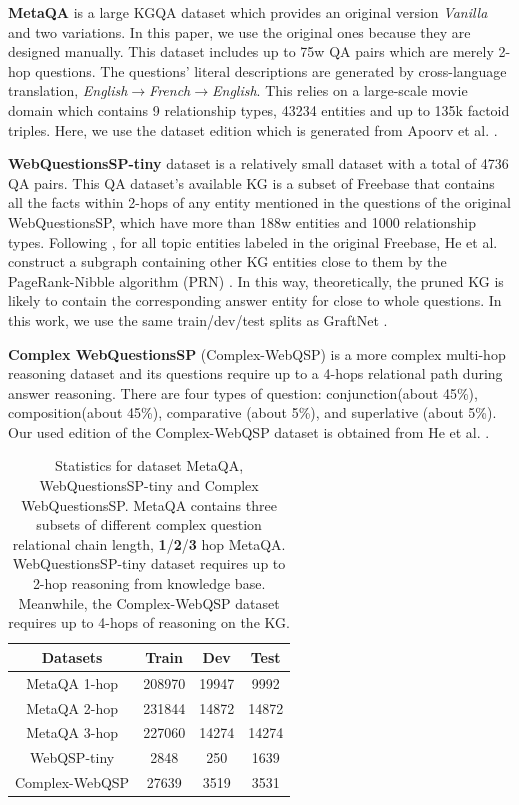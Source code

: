 \documentclass[pdflatex,sn-mathphys]{sn-jnl}%
\theoremstyle{thmstyleone}%
\theoremstyle{thmstyletwo}%
\theoremstyle{thmstylethree}%
\begin{document}
\textbf{MetaQA} \cite{zhang2018metaQA} is a large KGQA dataset which provides an original version \textit{Vanilla} and two variations. In this paper, we use the original ones because they are designed manually. This dataset includes up to 75w QA pairs which are merely 2-hop questions. The questions' literal descriptions are generated by cross-language translation, \textit{English$\rightarrow$French$\rightarrow$English}. This relies on a large-scale movie domain which contains 9 relationship types, 43234 entities and up to 135k factoid triples. Here, we use the dataset edition which is generated from Apoorv et al. \cite{apoorv2020embedKGQA}.

\textbf{WebQuestionsSP-tiny} \cite{tauyih2016wbquestion} dataset is a relatively small dataset with a total of 4736 QA pairs. This QA dataset's available KG is a subset of Freebase  that contains all the facts within 2-hops of any entity mentioned in the questions of the original WebQuestionsSP, which have more than 188w entities and 1000 relationship types. Following \cite{apoorv2020embedKGQA}, for all topic entities labeled in the original Freebase, He et al. \cite{he2021stu-teaQA} construct a subgraph containing other KG entities close to them by the PageRank-Nibble algorithm (PRN) \cite{rpn}. In this way, theoretically, the pruned KG is likely to contain the corresponding answer entity for close to whole questions. In this work, we use the same train/dev/test splits as GraftNet \cite{sun2018graftnet}.


\textbf{Complex WebQuestionsSP} (Complex-WebQSP)\cite{TalmorCWQ} is a more complex multi-hop reasoning dataset and its questions require up to a 4-hops relational path during answer reasoning. There are four types of question: conjunction(about 45\%),  composition(about 45\%), comparative (about 5\%), and superlative (about 5\%). Our used edition of the Complex-WebQSP dataset is obtained from He et al. \cite{he2021stu-teaQA}.

\begin{table}[h]
\renewcommand{\arraystretch}{1.2}
\caption{Statistics for dataset MetaQA, WebQuestionsSP-tiny and Complex WebQuestionsSP. MetaQA contains three subsets of different complex question relational chain length, \textbf{1}/\textbf{2}/\textbf{3} hop MetaQA. WebQuestionsSP-tiny dataset requires up to 2-hop reasoning from knowledge base. Meanwhile, the Complex-WebQSP dataset requires up to 4-hops of reasoning on the KG.}
\label{dataset_details}
\centering
\begin{tabular}{c|ccc}  \hline
Datasets & Train & Dev & Test \\ \hline
MetaQA 1-hop & 208970 & 19947 & 9992 \\
MetaQA 2-hop & 231844 & 14872 & 14872 \\ 
MetaQA 3-hop & 227060 & 14274 & 14274 \\ \hline
WebQSP-tiny & 2848 & 250 & 1639 \\ 
Complex-WebQSP & 27639 & 3519 & 3531 \\ \hline
\end{tabular}
\end{table}
\end{document}
